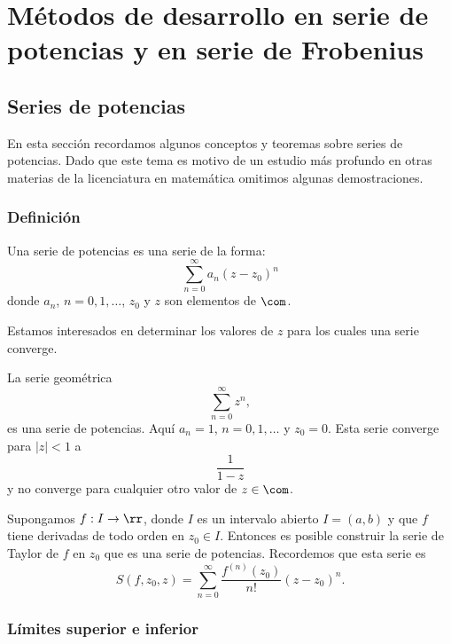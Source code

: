 



\chapter[Series de Potencias y de Frobenius]{Métodos de desarrollo en serie de potencias y en serie de Frobenius}

%



 \section{Series de potencias}

En esta sección recordamos algunos conceptos y teoremas sobre series de potencias. Dado que este tema es motivo de un estudio más profundo en otras materias de la licenciatura en matemática omitimos algunas demostraciones.
\subsection{Definición} %
\begin{definicion}{} Una serie de potencias es una serie de la forma:
\[
	\sum\limits_{n=0}^{\infty}a_n(z-z_0)^n
\]
donde $a_n$, $n=0,1,\ldots$, $z_0$ y $z$ son elementos de $\com$.
\end{definicion}


Estamos interesados en determinar los valores de $z$ para los cuales   una serie converge.

\begin{ejemplo}{} La serie geométrica
\[
	\sum\limits_{n=0}^{\infty}z^n,
\]
es una serie de potencias. Aquí  $a_n=1$, $n=0,1,\ldots$ y $z_0=0$. Esta serie converge para $|z|<1$ a
\[ \frac{1}{1-z}\]
y no converge para cualquier otro valor de $z\in\com$.
\end{ejemplo}

\begin{ejemplo}{} Supongamos $f:I\to\rr$, donde $I$ es un intervalo abierto $I=(a,b)$ y que $f$ tiene derivadas de todo orden en  $z_0\in I$. Entonces es posible construir la serie de Taylor de $f$ en $z_0$ que es una serie de potencias. Recordemos que esta serie es
\[S(f,z_0,z)=\sum\limits_{n=0}^{\infty}\frac{f^{(n)}(z_0)}{n!}(z-z_0)^n.\]
\end{ejemplo}




\subsection{Límites superior e inferior}


